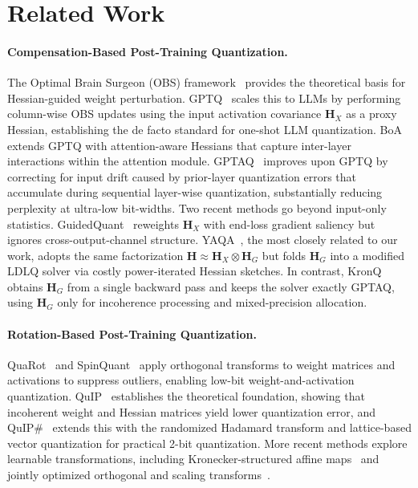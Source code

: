 \documentclass{article} %
\newcommand{\KronQ}{\textsc{KronQ}}
\begin{document}
\section{Related Work}
\label{sec:related}
\vspace{-3mm}
\paragraph{Compensation-Based Post-Training Quantization.}
The Optimal Brain Surgeon (OBS) framework~\citep{hassibi1992second, lecun1989optimal} provides the theoretical basis for Hessian-guided weight perturbation. GPTQ~\citep{frantar2022gptq} scales this to LLMs by performing column-wise OBS updates using the input activation covariance $\mathbf{H}_X$ as a proxy Hessian, establishing the de facto standard for one-shot LLM quantization. BoA~\citep{kim2024boa} extends GPTQ with attention-aware Hessians that capture inter-layer interactions within the attention module. GPTAQ~\citep{li2025gptaq} improves upon GPTQ by correcting for input drift caused by prior-layer quantization errors that accumulate during sequential layer-wise quantization, substantially reducing perplexity at ultra-low bit-widths.
Two recent methods go beyond input-only statistics. GuidedQuant~\citep{kim2025guidedquant} reweights $\mathbf{H}_X$ with end-loss gradient saliency but ignores cross-output-channel structure. YAQA~\citep{tseng2025model}, the most closely related to our work, adopts the same factorization $\mathbf{H} \approx \mathbf{H}_X \otimes \mathbf{H}_G$ but folds $\mathbf{H}_G$ into a modified LDLQ solver via costly power-iterated Hessian sketches. In contrast, KronQ obtains $\mathbf{H}_G$ from a single backward pass and keeps the solver exactly GPTAQ, using  $\mathbf{H}_G$ only for incoherence processing and mixed-precision allocation.




\vspace{-2mm}
\paragraph{Rotation-Based Post-Training Quantization.} QuaRot~\citep{ashkboos2024quarot} and SpinQuant~\citep{liu2024spinquant} apply orthogonal transforms to weight matrices and activations to suppress outliers, enabling low-bit weight-and-activation quantization. QuIP~\citep{chee2023quip} establishes the theoretical foundation, showing that incoherent weight and Hessian matrices yield lower quantization error, and QuIP\#~\citep{tseng2024quip} extends this with the randomized Hadamard transform and lattice-based vector quantization for practical 2-bit quantization. More recent methods explore learnable transformations, including Kronecker-structured affine maps~\citep{sun2024flatquant} and jointly optimized orthogonal and scaling transforms~\citep{hu2025ostquant}.
 
\end{document}
